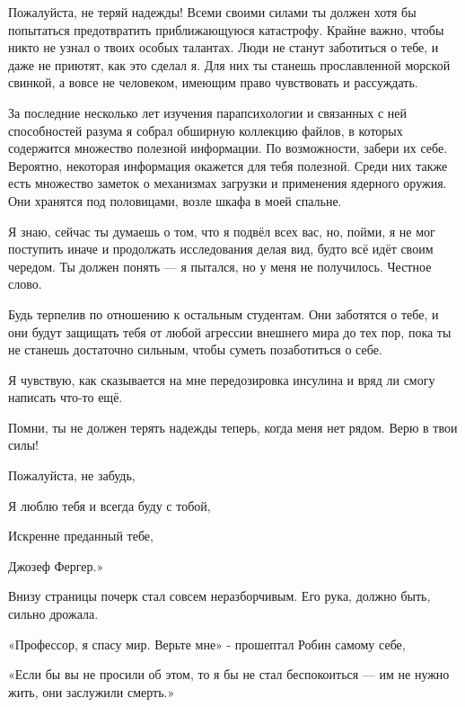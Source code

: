 \documentclass[a4paper,12pt]{book}
\begin{document}
\par
Пожалуйста, не теряй надежды! Всеми своими силами ты должен хотя бы попытаться предотвратить приближающуюся катастрофу. Крайне важно, чтобы никто не узнал о твоих особых талантах. Люди не станут заботиться о тебе, и даже не приютят, как это сделал я. Для них ты станешь прославленной морской свинкой, а вовсе не человеком, имеющим право чувствовать и рассуждать.
\par
За последние несколько лет изучения парапсихологии и связанных с ней способностей разума я собрал обширную коллекцию файлов, в которых содержится множество полезной информации. По возможности, забери их себе. Вероятно, некоторая информация окажется для тебя полезной. Среди них также есть множество заметок о механизмах загрузки и применения ядерного оружия. Они хранятся под половицами, возле шкафа в моей спальне.
\par
Я знаю, сейчас ты думаешь о том, что я подвёл всех вас, но, пойми, я не мог поступить иначе и продолжать исследования делая вид, будто всё идёт своим чередом. Ты должен понять — я пытался, но у меня не получилось. Честное слово.
\par
Будь терпелив по отношению к остальным студентам. Они заботятся о тебе, и они будут защищать тебя от любой агрессии внешнего мира до тех пор, пока ты не станешь достаточно сильным, чтобы суметь позаботиться о себе.
\par
Я чувствую, как сказывается на мне передозировка инсулина и вряд ли смогу написать что-то ещё.
\par
Помни, ты не должен терять надежды теперь, когда меня нет рядом. Верю в твои силы!\\
\par
\par
Пожалуйста, не забудь,\\
\par
Я люблю тебя и всегда буду с тобой,\\
\par
Искренне преданный тебе,\\
\par
Джозеф Фергер.»\\
\par
Внизу страницы почерк стал совсем неразборчивым. Его рука, должно быть, сильно дрожала.
\par
«Профессор, я спасу мир. Верьте мне» - прошептал Робин самому себе,
\par
«Если бы вы не просили об этом, то я бы не стал беспокоиться — им не нужно жить, они заслужили смерть.»
\end{document}
